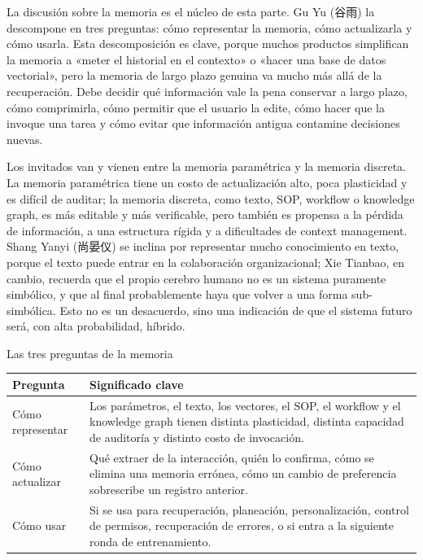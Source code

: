 La discusión sobre la memoria es el núcleo de esta parte. Gu Yu (谷雨) la descompone en tres preguntas: cómo representar la memoria, cómo actualizarla y cómo usarla. Esta descomposición es clave, porque muchos productos simplifican la memoria a «meter el historial en el contexto» o «hacer una base de datos vectorial», pero la memoria de largo plazo genuina va mucho más allá de la recuperación. Debe decidir qué información vale la pena conservar a largo plazo, cómo comprimirla, cómo permitir que el usuario la edite, cómo hacer que la invoque una tarea y cómo evitar que información antigua contamine decisiones nuevas.

Los invitados van y vienen entre la memoria paramétrica y la memoria discreta. La memoria paramétrica tiene un costo de actualización alto, poca plasticidad y es difícil de auditar; la memoria discreta, como texto, SOP, workflow o knowledge graph, es más editable y más verificable, pero también es propensa a la pérdida de información, a una estructura rígida y a dificultades de context management. Shang Yanyi (尚晏仪) se inclina por representar mucho conocimiento en texto, porque el texto puede entrar en la colaboración organizacional; Xie Tianbao, en cambio, recuerda que el propio cerebro humano no es un sistema puramente simbólico, y que al final probablemente haya que volver a una forma sub-simbólica. Esto no es un desacuerdo, sino una indicación de que el sistema futuro será, con alta probabilidad, híbrido.

\begin{knowledgebox}{Las tres preguntas de la memoria}
\begin{tabularx}{\textwidth}{>{\raggedright\arraybackslash}p{} Y}
\toprule
Pregunta & Significado clave \\
\midrule
Cómo representar & Los parámetros, el texto, los vectores, el SOP, el workflow y el knowledge graph tienen distinta plasticidad, distinta capacidad de auditoría y distinto costo de invocación. \\
Cómo actualizar & Qué extraer de la interacción, quién lo confirma, cómo se elimina una memoria errónea, cómo un cambio de preferencia sobrescribe un registro anterior. \\
Cómo usar & Si se usa para recuperación, planeación, personalización, control de permisos, recuperación de errores, o si entra a la siguiente ronda de entrenamiento. \\
\bottomrule
\end{tabularx}
\end{knowledgebox}

